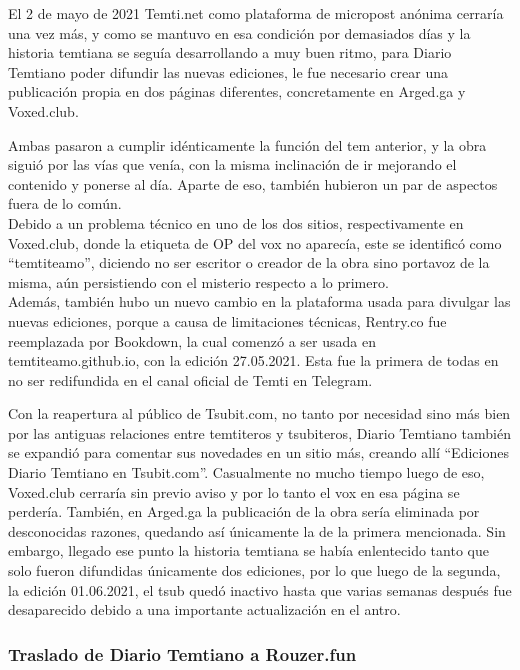 \documentclass[
  spanish,
]{book}
\begin{document}
El 2 de mayo de 2021 Temti.net como plataforma de micropost anónima cerraría una vez más, y como se mantuvo en esa condición por demasiados días y la historia temtiana se seguía desarrollando a muy buen ritmo, para Diario Temtiano poder difundir las nuevas ediciones, le fue necesario crear una publicación propia en dos páginas diferentes, concretamente en Arged.ga y Voxed.club.

Ambas pasaron a cumplir idénticamente la función del tem anterior, y la obra siguió por las vías que venía, con la misma inclinación de ir mejorando el contenido y ponerse al día. Aparte de eso, también hubieron un par de aspectos fuera de lo común.\\
Debido a un problema técnico en uno de los dos sitios, respectivamente en Voxed.club, donde la etiqueta de OP del vox no aparecía, este se identificó como ``temtiteamo'', diciendo no ser escritor o creador de la obra sino portavoz de la misma, aún persistiendo con el misterio respecto a lo primero.\\
Además, también hubo un nuevo cambio en la plataforma usada para divulgar las nuevas ediciones, porque a causa de limitaciones técnicas, Rentry.co fue reemplazada por Bookdown, la cual comenzó a ser usada en temtiteamo.github.io, con la edición 27.05.2021. Esta fue la primera de todas en no ser redifundida en el canal oficial de Temti en Telegram.

Con la reapertura al público de Tsubit.com, no tanto por necesidad sino más bien por las antiguas relaciones entre temtiteros y tsubiteros, Diario Temtiano también se expandió para comentar sus novedades en un sitio más, creando allí ``Ediciones Diario Temtiano en Tsubit.com''. Casualmente no mucho tiempo luego de eso, Voxed.club cerraría sin previo aviso y por lo tanto el vox en esa página se perdería. También, en Arged.ga la publicación de la obra sería eliminada por desconocidas razones, quedando así únicamente la de la primera mencionada. Sin embargo, llegado ese punto la historia temtiana se había enlentecido tanto que solo fueron difundidas únicamente dos ediciones, por lo que luego de la segunda, la edición 01.06.2021, el tsub quedó inactivo hasta que varias semanas después fue desaparecido debido a una importante actualización en el antro.

\hypertarget{traslado-de-diario-temtiano-a-rouzer.fun}{%
\subsubsection*{Traslado de Diario Temtiano a Rouzer.fun}\label{traslado-de-diario-temtiano-a-rouzer.fun}}
\end{document}
